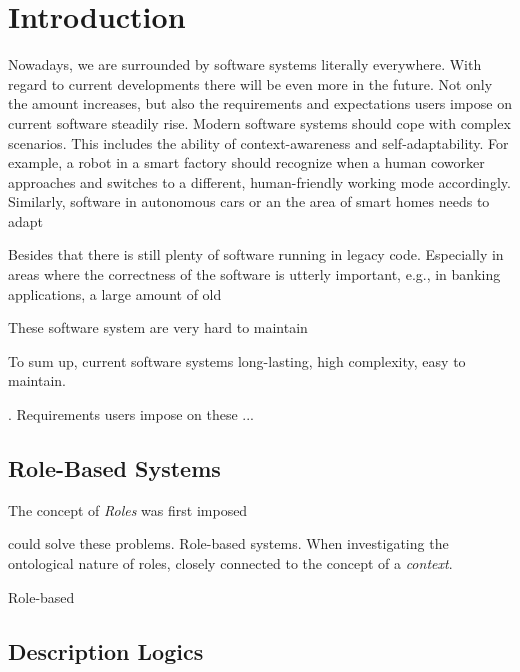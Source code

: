 

\listoftodos

\chapter{Introduction}
\label{ch:introduction}

Nowadays, we are surrounded by software systems literally everywhere. With regard to current
developments there will be even more in the future. Not only the amount increases, but also the
requirements and expectations users impose on current software steadily rise. Modern software
systems should cope with complex scenarios. This includes the ability of context-awareness and
self-adaptability. For example, a robot in a smart factory should recognize when a human coworker
approaches and switches to a different, human-friendly working mode accordingly. Similarly, software
in autonomous cars or an the area of smart homes needs to adapt 


Besides that there is still plenty of software running in legacy code. Especially in areas
where the correctness of the software is utterly important, e.g., in banking applications, a large
amount of old 

These software system are very hard to maintain


To sum up, current software systems long-lasting, high complexity, easy to maintain.



. Requirements
users impose on these ... 




\section{Role-Based Systems}
\label{sec:intro-role-based-systems}

The concept of \emph{Roles} was first imposed


could solve these problems.  Role-based
systems. When investigating the ontological nature of roles, closely connected to the concept of a
\emph{context}.  


Role-based

\section{Description Logics}
\label{sec:intro-description-logics}

